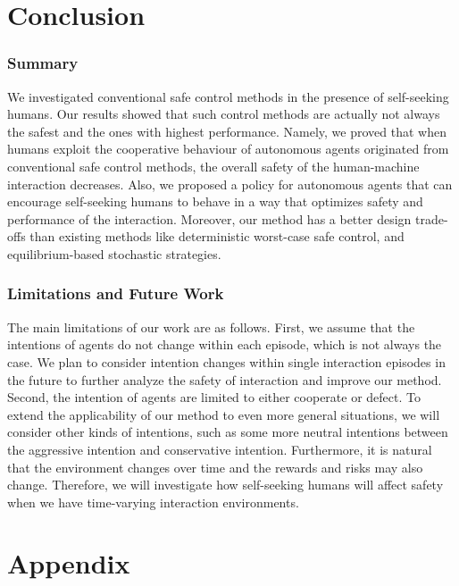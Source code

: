\documentclass[letterpaper]{article} %
\begin{document}
\section{Conclusion} 
\subsubsection{Summary} 
We investigated conventional safe control methods in the presence of self-seeking humans. Our results showed that such control methods are actually not always the safest and the ones with highest performance.  Namely, we proved that when humans exploit the cooperative behaviour of autonomous agents originated from conventional safe control methods, the overall safety of the human-machine interaction decreases. Also, we proposed a policy for autonomous agents that can encourage self-seeking humans to behave in a way that optimizes safety and performance of the interaction. Moreover, our method has a better design trade-offs than existing methods like deterministic worst-case safe control, and equilibrium-based stochastic strategies.

\subsubsection{Limitations and Future Work} 
The main limitations of our work are as follows. First, we assume that the intentions of agents do not change within each episode, which is not always the case. We plan to consider intention changes within single interaction episodes in the future to further analyze the safety of interaction and improve our method. Second, the intention of agents are limited to either cooperate or defect. To extend the applicability of our method to even more general situations, we will consider other kinds of intentions, such as some more neutral intentions between the aggressive intention and conservative intention. Furthermore, it is natural that the environment changes over time and the rewards and risks may also change. Therefore, we will investigate how self-seeking humans will affect safety when we have time-varying interaction environments.




\appendix
\onecolumn
\section*{Appendix}
\renewcommand\qedsymbol{$\blacksquare$}
\end{document}

